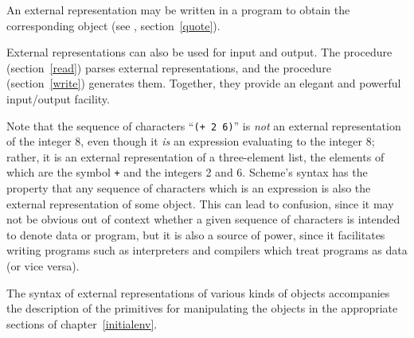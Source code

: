 An external representation may be written in a program to obtain the
corresponding object (see , section~\ref{quote}).

External representations can also be used for input and output.  The
procedure  (section~\ref{read}) parses external
representations, and the procedure  (section~\ref{write})
generates them.  Together, they provide an elegant and powerful
input/output facility.

Note that the sequence of characters ``{\tt(+ 2 6)}'' is {\em not} an
external representation of the integer 8, even though it {\em is} an
expression evaluating to the integer 8; rather, it is an external
representation of a three-element list, the elements of which are the symbol
{\tt +} and the integers 2 and 6.  Scheme's syntax has the property that
any sequence of characters which is an expression is also the external
representation of some object.  This can lead to confusion, since it may
not be obvious out of context whether a given sequence of characters is
intended to denote data or program, but it is also a source of power,
since it facilitates writing programs such as interpreters and
compilers which treat programs as data (or vice versa).

The syntax of external representations of various kinds of objects
accompanies the description of the primitives for manipulating the
objects in the appropriate sections of chapter~\ref{initialenv}.
